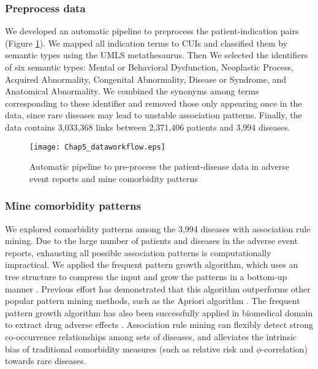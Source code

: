 \subsubsection{Preprocess data}
We developed an automatic pipeline to preprocess the patient-indication pairs (Figure \ref{dataworkflow}).
We mapped all indication terms to CUIs and classified them by semantic types using the UMLS metathesaurus.
Then We selected the identifiers of six semantic types: Mental or Behavioral Dysfunction, Neoplastic Process, Acquired Abnormality, Congenital Abnormality, Disease or Syndrome, and Anatomical Abnormality. We combined the synonyms among terms corresponding to these identifier and removed those only appearing once in the data, since rare diseases may lead to unstable association patterns. Finally, the data contains 3,033,368 links between 2,371,406 patients and 3,994 diseases.
\begin{figure}[!ht]
\begin{center}
\texttt{[image: Chap5\_dataworkflow.eps]}
\end{center}
\vspace{-0.5cm}
\caption{
{Automatic pipeline to pre-process the patient-disease data in adverse event reports and mine comorbidity patterns}
}
\vspace{-0.5cm}
\label{dataworkflow}
\end{figure}


\subsubsection{Mine comorbidity patterns}
We explored comorbidity patterns among the 3,994 diseases with association rule mining.
Due to the large number of patients and diseases in the adverse event reports,
exhausting all possible association patterns is computationally impractical.
We applied the frequent pattern growth algorithm,
which uses an tree structure to compress the input and grow
the patterns in a bottom-up manner \cite{han2000mining}.
Previous effort has demonstrated that this algorithm outperforms other popular pattern mining methods,
such as the Apriori algorithm \cite{agrawal1994fast}.
The frequent pattern growth algorithm has also been successfully
applied in biomedical domain to extract drug adverse effects \cite{luo2013mining}.
Association rule mining can flexibly detect strong co-occurrence relationships among sets of diseases, and alleviates the intrinsic bias of traditional comorbidity measures (such as relative risk and $\phi$-correlation) towards rare diseases.

